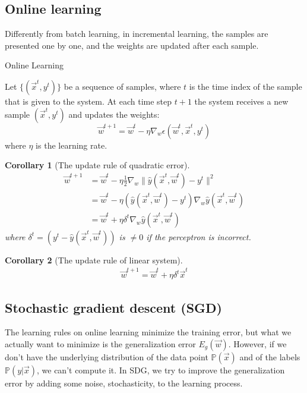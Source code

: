 \documentclass[11pt]{book} %
\newtheorem{corollary}{Corollary}[section]
\begin{document}
\subsection{Online learning}

Differently from batch learning, in incremental learning, the samples are presented one by one, and the weights are updated after each sample.

\begin{algorithm}[H]
    \SetAlgoLined
    \caption{Online Learning}
    Let $\{ (\vec{x}^t, y^t) \}$ be a sequence of samples, where $t$ is the time index of the sample that is given to the system. At each time step $t+1$ the system receives a new sample $(\vec{x}^{t}, y^{t})$ and updates the weights: 
    \[ \vec{w}^{t+1} = \vec{w}^{t} - \eta \nabla_w \epsilon(\vec{w}^{t}, \vec{x}^{t}, y^{t}) \]
    where $\eta$ is the learning rate.
\end{algorithm}


\begin{corollary}[The update rule of quadratic error]\ \\
    \begin{align*}
        \vec{w}^{t+1} &= \vec{w}^{t} - \eta \frac{1}{2} \nabla_w \lVert \hat{y}(\vec{x}^t, \vec{w}^t) - y^t \rVert^2  \\ 
        &= \vec{w}^{t} - \eta (\hat{y}(\vec{x}^t, \vec{w}^t) - y^t) \nabla_w \hat{y}(\vec{x}^t, \vec{w}^t) \\
        &= \vec{w}^{t} + \eta \delta^t \nabla_w \hat{y}(\vec{x}^t, \vec{w}^t)
    \end{align*}
    where $\delta^t = (y^t - \hat{y}(\vec{x}^t, \vec{w}^t))$ is $\neq 0$ if the perceptron is incorrect.
\end{corollary}

\begin{corollary}[The update rule of linear system]\ \\
    \begin{align}
        \vec{w}^{t+1} = \vec{w}^{t} + \eta \delta^t \vec{x}^t
    \end{align}
    

\end{corollary}


\subsection{Stochastic gradient descent (SGD)}
The learning rules on online learning minimize the training error, but what we actually want to minimize is the generalization error $E_{g}(\vec{w})$.
However, if we don't have the underlying distribution of the data point $\mathbb{P}(\vec{x})$ and of the labels $\mathbb{P}(y|\vec{x})$, we can't compute it.
In SDG, we try to improve the generalization error by adding some noise, stochasticity, to the learning process.
\end{document}
